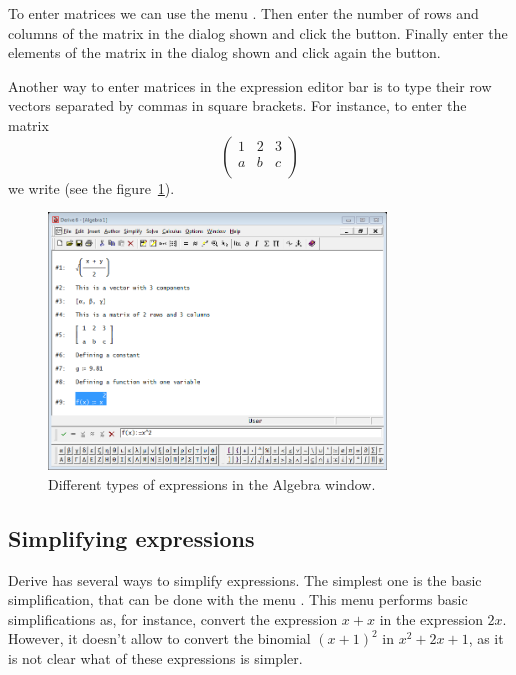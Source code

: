 To enter matrices we can use the menu .
Then enter the number of rows and columns of the matrix in the dialog shown and click the  button. 
Finally enter the elements of the matrix in the dialog shown and click again the  button. 

Another way to enter matrices in the expression editor bar is to type their row vectors separated by commas in square brackets. 
For instance, to enter the matrix
\[
\left(
\begin{array}{ccc}
 1 & 2 & 3 \\
 a & b & c \\
\end{array}
\right)
\]
we write \command{[[1,2,3],[a,b,c]]} (see the figure~\ref{g:expressions}).

\begin{figure}[h!]
\begin{center}
\includegraphics[width=0.8\textwidth]{img/introduction/expressions}
\caption{Different types of expressions in the Algebra window.}
\label{g:expressions}
\end{center}
\end{figure}


\subsection*{Simplifying expressions}
Derive has several ways to simplify expressions.
The simplest one is the basic simplification, that can be done with the menu . 
This menu performs basic simplifications as, for instance, convert the expression $x+x$ in the expression $2x$. 
However, it doesn't allow to convert the binomial $(x+1)^2$ in $x^2+2x+1$, as it is not clear what of these expressions is simpler. 

